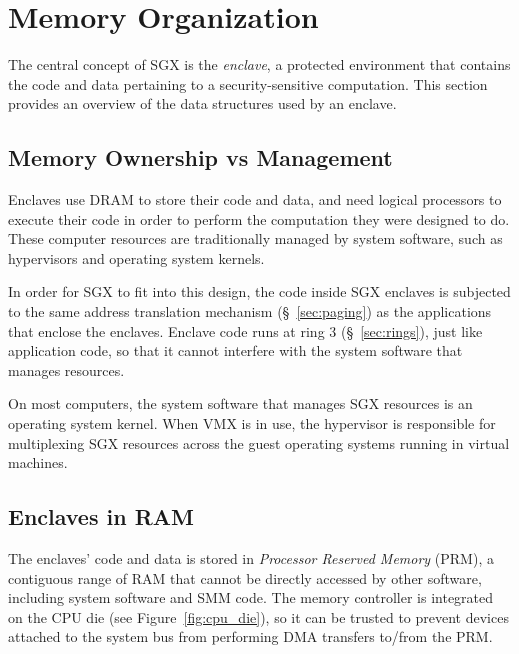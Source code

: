 \section{Memory Organization}
\label{sec:memory}

The central concept of SGX is the \textit{enclave}, a protected environment
that contains the code and data pertaining to a security-sensitive computation.
This section provides an overview of the data structures used by an enclave.


\subsection{Memory Ownership vs Management}


Enclaves use DRAM to store their code and data, and need logical processors to
execute their code in order to perform the computation they were designed to
do. These computer resources are traditionally managed by system software,
such as hypervisors and operating system kernels.

In order for SGX to fit into this design, the code inside SGX enclaves is
subjected to the same address translation mechanism (\S~\ref{sec:paging}) as
the applications that enclose the enclaves. Enclave code runs at ring 3
(\S~\ref{sec:rings}), just like application code, so that it cannot
interfere with the system software that manages resources.


On most computers, the system software that manages SGX resources is an
operating system kernel. When VMX is in use, the hypervisor is responsible for
multiplexing SGX resources across the guest operating systems running in
virtual machines.


\subsection{Enclaves in RAM}
\label{sec:prm}


The enclaves' code and data is stored in \textit{Processor Reserved Memory}
(PRM), a contiguous range of RAM that cannot be directly accessed by other
software, including system software and SMM code. The memory controller is
integrated on the CPU die (see Figure~\ref{fig:cpu_die}), so it can be trusted
to prevent devices attached to the system bus from performing DMA transfers
to/from the PRM.

